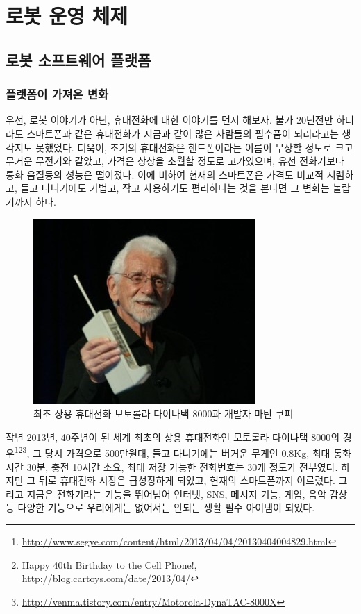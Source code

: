 
\chapter{로봇 운영 체제}

\section{로봇 소프트웨어 플랫폼}

\subsection{플랫폼이 가져온 변화}

우선, 로봇 이야기가 아닌, 휴대전화에 대한 이야기를 먼저 해보자.
불가 20년전만 하더라도 스마트폰과 같은 휴대전화가 지금과 같이 많은 사람들의 필수품이 되리라고는 생각지도 못했었다.
더욱이, 초기의 휴대전화은 핸드폰이라는 이름이 무상할 정도로 크고 무거운 무전기와 같았고, 가격은 상상을 초월할 정도로 고가였으며, 유선 전화기보다 통화 음질등의 성능은 떨어졌다.
이에 비하여 현재의 스마트폰은 가격도 비교적 저렴하고, 들고 다니기에도 가볍고, 작고 사용하기도 편리하다는 것을 본다면 그 변화는 놀랍기까지 하다.

\begin{figure}[h]
\centering\includegraphics[width=0.5\columnwidth]{pictures/chapter1/motorola_dynatac.jpg}
\caption{최초 상용 휴대전화 모토롤라 다이나택 8000과 개발자 마틴 쿠퍼}
\end{figure}

작년 2013년, 40주년이 된 세계 최초의 상용 휴대전화인 모토롤라 다이나택 8000의 경우\footnote{\url{http://www.segye.com/content/html/2013/04/04/20130404004829.html}}\footnote{Happy 40th Birthday to the Cell Phone!, \url{http://blog.cartoys.com/date/2013/04/}}\footnote{\url{http://venma.tistory.com/entry/Motorola-DynaTAC-8000X}}, 그 당시 가격으로 500만원대, 들고 다니기에는 버거운 무게인 0.8Kg, 최대 통화시간 30분, 충전 10시간 소요, 최대 저장 가능한 전화번호는 30개 정도가 전부였다.
하지만 그 뒤로 휴대전화 시장은 급성장하게 되었고, 현재의 스마트폰까지 이르렀다.
그리고 지금은 전화기라는 기능을 뛰어넘어 인터넷, SNS, 메시지 기능, 게임, 음악 감상 등 다양한 기능으로 우리에게는 없어서는 안되는 생활 필수 아이템이 되었다.

